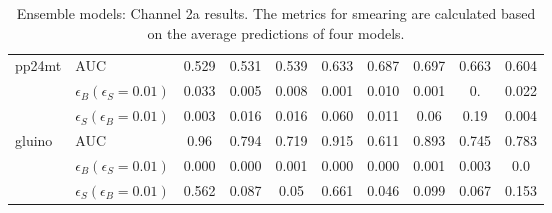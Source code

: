 \begin{table}[H]
\begin{tabular}{ll|ccc|cc|ccc}
    \hline
    \multirow{3}{*}{pp24mt} & AUC    & 0.529 & 0.531 & 0.539 & 0.633 & 0.687 & 0.697 & 0.663 & 0.604 \\
    & $\epsilon_B(\epsilon_S=0.01)$  & 0.033 & 0.005 & 0.008 & 0.001 & 0.010 & 0.001 & 0. & 0.022 \\
    & $\epsilon_S(\epsilon_B=0.01)$  & 0.003 & 0.016 & 0.016 & 0.060 & 0.011 & 0.06 & 0.19 & 0.004 \\
    \hline
    \multirow{3}{*}{gluino} & AUC    & 0.96 & 0.794 & 0.719 & 0.915 & 0.611 & 0.893 & 0.745 & 0.783 \\
    & $\epsilon_B(\epsilon_S=0.01)$  & 0.000 & 0.000 & 0.001 & 0.000 & 0.000 & 0.001 & 0.003 & 0.0 \\
    & $\epsilon_S(\epsilon_B=0.01)$  & 0.562 & 0.087 & 0.05 & 0.661 & 0.046 & 0.099 & 0.067 & 0.153 \\
    \hline
    \end{tabular}
    \caption{Ensemble models: Channel 2a results. The metrics for smearing are calculated based on the average predictions of four models.}
    \label{tab:ch2a_all}
\end{table}
    